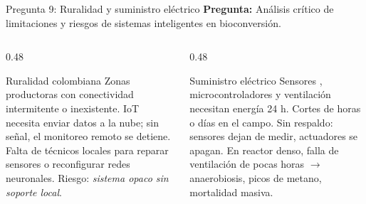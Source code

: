 \documentclass[aspectratio=169, 11pt]{beamer}
\newcommand{\NDIR}{\text{NDIR}}
\begin{document}
\begin{frame}{Pregunta 9: Ruralidad y suministro eléctrico}
\textbf{Pregunta:} Análisis crítico de limitaciones y riesgos de sistemas inteligentes en bioconversión.

\vspace{0.3cm}
\begin{columns}[T]
\begin{column}{0.48\textwidth}
\begin{alertblock}{Ruralidad colombiana}
\footnotesize
Zonas productoras con conectividad intermitente o inexistente. IoT necesita enviar datos a la nube; sin señal, el monitoreo remoto se detiene. Falta de técnicos locales para reparar sensores o reconfigurar redes neuronales. Riesgo: \textit{sistema opaco sin soporte local}.
\end{alertblock}
\end{column}
\begin{column}{0.48\textwidth}
\begin{alertblock}{Suministro eléctrico}
\footnotesize
Sensores \NDIR, microcontroladores y ventilación necesitan energía 24 h. Cortes de horas o días en el campo. Sin respaldo: sensores dejan de medir, actuadores se apagan. En reactor denso, falla de ventilación de pocas horas $\rightarrow$ anaerobiosis, picos de metano, mortalidad masiva.
\end{alertblock}
\end{column}
\end{columns}
\end{frame}
\end{document}
